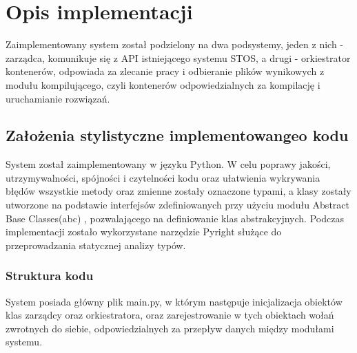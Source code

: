 \section{Opis implementacji}
Zaimplementowany system został podzielony na dwa podsystemy, jeden z nich - zarządca, komunikuje się z API istniejącego systemu STOS, a drugi - orkiestrator kontenerów, odpowiada za zlecanie pracy i odbieranie plików wynikowych z modułu kompilującego, czyli kontenerów odpowiedzialnych za kompilację i uruchamianie rozwiązań.

\subsection{Założenia stylistyczne implementowangeo kodu}
System został zaimplementowany w języku Python. W celu poprawy jakości, utrzymywalności, spójności i czytelności kodu oraz ułatwienia wykrywania błędów wszystkie metody oraz zmienne zostały oznaczone typami, a klasy zostały utworzone na podstawie interfejsów zdefiniowanych przy użyciu modułu Abstract Base Classes(abc) \cite{pythonAbc}, pozwalającego na definiowanie klas abstrakcyjnych. Podczas implementacji zostało wykorzystane narzędzie Pyright służące do przeprowadzania statycznej analizy typów.

\subsubsection{Struktura kodu}
System posiada główny plik main.py, w którym następuje inicjalizacja obiektów klas zarządcy oraz orkiestratora, oraz zarejestrowanie w tych obiektach wołań zwrotnych do siebie, odpowiedzialnych za przepływ danych między modułami systemu.
